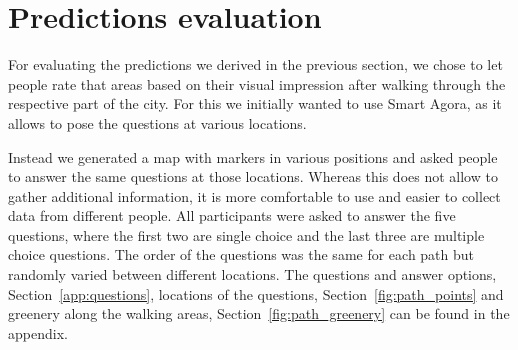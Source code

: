 \documentclass[letterpaper]{article}
\begin{document}
\section{Predictions evaluation}\label{sec:exp}
For evaluating the predictions we derived in the previous section, we chose to let people rate
that areas based on their visual impression after walking through the respective part of the city.
For this we initially wanted to use Smart Agora, as it allows to pose the questions at various locations.

Instead we generated a map with markers in various positions and asked people to answer the same questions at those locations.
Whereas this does not allow to gather additional information, it is more comfortable to use and easier to collect data from
different people. All participants were asked to answer the five questions, where the first two are single choice
and the last three are multiple choice questions. The order of the questions was the same for each path but randomly varied
between different locations. The questions and answer options, Section~\ref{app:questions}, locations of the questions, Section~\ref{fig:path_points}
and greenery along the walking areas, Section~\ref{fig:path_greenery} can be found in the appendix.
\end{document}
